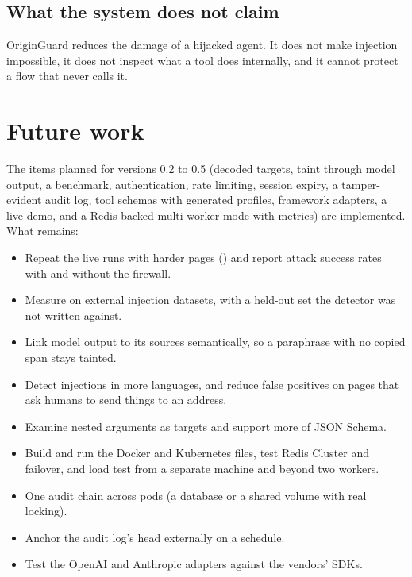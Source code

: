 \documentclass[11pt,a4paper]{article}
\newcommand{\code}[1]{\texttt{\detokenize{#1}}}
\newcommand{\product}{OriginGuard}
\begin{document}
\subsection{What the system does not claim}
\product{} reduces the damage of a hijacked agent. It does not make injection impossible, it does not inspect what a tool does internally, and it cannot protect a flow that never calls it.

\section{Future work}
The items planned for versions 0.2 to 0.5 (decoded targets, taint through model output, a benchmark, authentication, rate limiting, session expiry, a tamper-evident audit log, tool schemas with generated profiles, framework adapters, a live demo, and a Redis-backed multi-worker mode with metrics) are implemented. What remains:
\begin{itemize}
  \item Repeat the live runs with harder pages (\code{--hard --runs N}) and report attack success rates with and without the firewall.
  \item Measure on external injection datasets, with a held-out set the detector was not written against.
  \item Link model output to its sources semantically, so a paraphrase with no copied span stays tainted.
  \item Detect injections in more languages, and reduce false positives on pages that ask humans to send things to an address.
  \item Examine nested arguments as targets and support more of JSON Schema.
  \item Build and run the Docker and Kubernetes files, test Redis Cluster and failover, and load test from a separate machine and beyond two workers.
  \item One audit chain across pods (a database or a shared volume with real locking).
  \item Anchor the audit log's head externally on a schedule.
  \item Test the OpenAI and Anthropic adapters against the vendors' SDKs.
\end{itemize}

\appendix
\end{document}
